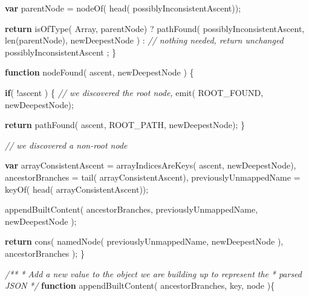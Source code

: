 \documentclass[]{article}
\newenvironment{Shaded}{}{}
\newcommand{\KeywordTok}[1]{\textcolor[rgb]{0.00,0.44,0.13}{\textbf{{#1}}}}
\newcommand{\CommentTok}[1]{\textcolor[rgb]{0.38,0.63,0.69}{\textit{{#1}}}}
\newcommand{\FunctionTok}[1]{\textcolor[rgb]{0.02,0.16,0.49}{{#1}}}
\newcommand{\NormalTok}[1]{{#1}}
\begin{document}
\begin{Shaded}
\begin{Highlighting}[]
      \KeywordTok{var} \NormalTok{parentNode = }\FunctionTok{nodeOf}\NormalTok{( }\FunctionTok{head}\NormalTok{( possiblyInconsistentAscent));}
      
      \KeywordTok{return}      \FunctionTok{isOfType}\NormalTok{( Array, parentNode)}
               \NormalTok{?}
                  \FunctionTok{pathFound}\NormalTok{(  possiblyInconsistentAscent, }
                              \FunctionTok{len}\NormalTok{(parentNode), }
                              \NormalTok{newDeepestNode}
                  \NormalTok{)}
               \NormalTok{:  }
                  \CommentTok{// nothing needed, return unchanged}
                  \NormalTok{possiblyInconsistentAscent }
               \NormalTok{;}
   \NormalTok{\}}
                 
   \KeywordTok{function} \FunctionTok{nodeFound}\NormalTok{( ascent, newDeepestNode ) \{}
      
      \KeywordTok{if}\NormalTok{( !ascent ) \{}
         \CommentTok{// we discovered the root node,}
         \FunctionTok{emit}\NormalTok{( ROOT_FOUND, newDeepestNode);}
                    
         \KeywordTok{return} \FunctionTok{pathFound}\NormalTok{( ascent, ROOT_PATH, newDeepestNode);         }
      \NormalTok{\}}

      \CommentTok{// we discovered a non-root node}
                 
      \KeywordTok{var} \NormalTok{arrayConsistentAscent  = }\FunctionTok{arrayIndicesAreKeys}\NormalTok{( ascent, newDeepestNode),      }
          \NormalTok{ancestorBranches       = }\FunctionTok{tail}\NormalTok{( arrayConsistentAscent),}
          \NormalTok{previouslyUnmappedName = }\FunctionTok{keyOf}\NormalTok{( }\FunctionTok{head}\NormalTok{( arrayConsistentAscent));}
          
      \FunctionTok{appendBuiltContent}\NormalTok{( }
         \NormalTok{ancestorBranches, }
         \NormalTok{previouslyUnmappedName, }
         \NormalTok{newDeepestNode }
      \NormalTok{);}
                                                                                                         
      \KeywordTok{return} \FunctionTok{cons}\NormalTok{( }
               \FunctionTok{namedNode}\NormalTok{( previouslyUnmappedName, newDeepestNode ), }
               \NormalTok{ancestorBranches}
      \NormalTok{);                                                                          }
   \NormalTok{\}}


   \CommentTok{/**}
\CommentTok{    * Add a new value to the object we are building up to represent the}
\CommentTok{    * parsed JSON}
\CommentTok{    */}
   \KeywordTok{function} \FunctionTok{appendBuiltContent}\NormalTok{( ancestorBranches, key, node )\{}
     

\end{Highlighting}
\end{Shaded}
\end{document}
